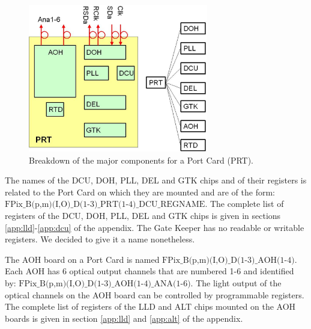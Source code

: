 \documentclass{cmspaper}
\begin{document}
\begin{figure}[hbtp]   
  \begin{center}   
        \includegraphics[width =0.7\textwidth]{prt_v1.eps}   
    \caption{Breakdown of the major components for a Port Card (PRT).}   
    \label{figure:prt}   
  \end{center}   
\end{figure}  

The names of the DCU, DOH, PLL, DEL and GTK chips
and of their registers is related to the Port Card on which they are mounted
and are of the form:
$\mbox{FPix\_B(p,m)(I,O)\_D(1-3)\_PRT(1-4)\_DCU\_REGNAME}$.
The complete list of registers of the DCU, DOH, PLL, DEL and GTK chips
is given in sections \ref{app:lld}-\ref{app:dcu} of the appendix. 
The Gate Keeper has no readable or writable registers.
We decided to give it  a name nonetheless.

The AOH board on a Port Card is named
$\mbox{FPix\_B(p,m)(I,O)\_D(1-3)\_AOH(1-4)}$.
Each AOH has 6 optical output channels that are numbered 1-6 and identified by:
$\mbox{FPix\_B(p,m)(I,O)\_D(1-3)\_AOH(1-4)\_ANA(1-6)}$.
The light output of the optical channels on the AOH board
can be controlled by programmable registers.
The complete list of registers of the LLD and ALT chips mounted on the AOH boards
is given in section \ref{app:lld} and \ref{app:alt} of the appendix.
\end{document}
